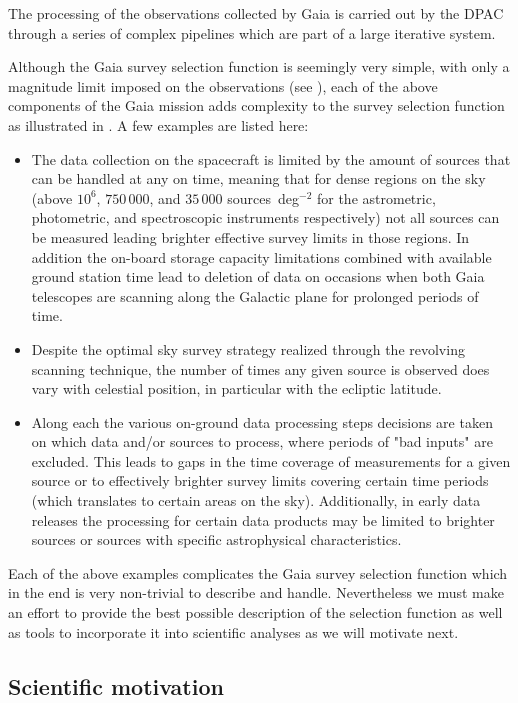 The processing of the observations collected by Gaia is carried out by the DPAC through a series of complex pipelines which are part of a large iterative system\citep[see section 7 in][]{2016A&A...595A...1G}.

Although the Gaia survey selection function is seemingly very simple, with only a magnitude limit imposed on the observations (see ), each of the above components of the Gaia mission adds complexity to the survey selection function as illustrated in . A few examples are listed here:
\begin{itemize}
    \item The data collection on the spacecraft is limited by the amount of sources that can be handled at any on time, meaning that for dense regions on the sky (above $10^6$, $750\,000$, and $35\,000$ sources~deg$^{-2}$ for the astrometric, photometric, and spectroscopic instruments respectively) not all sources can be measured leading brighter effective survey limits in those regions. In addition the on-board storage capacity limitations combined with available ground station time lead to deletion of data on occasions when both Gaia telescopes are scanning along the Galactic plane for prolonged periods of time.
    \item Despite the optimal sky survey strategy realized through the revolving scanning technique, the number of times any given source is observed does vary with celestial position, in particular with the ecliptic latitude.
    \item Along each the various on-ground data processing steps decisions are taken on which data and/or sources to process, where periods of "bad inputs" are excluded. This leads to gaps in the time coverage of measurements for a given source or to effectively brighter survey limits covering certain time periods (which translates to certain areas on the sky). Additionally, in early data releases the processing for certain data products may be limited to brighter sources or sources with specific astrophysical characteristics.
\end{itemize}
Each of the above examples complicates the Gaia survey selection function which in the end is very non-trivial to describe and handle. Nevertheless we must make an effort to provide the best possible description of the selection function as well as tools to incorporate it into scientific analyses as we will motivate next.

\subsection{Scientific motivation}
\label{sec:scientific-motivation}


